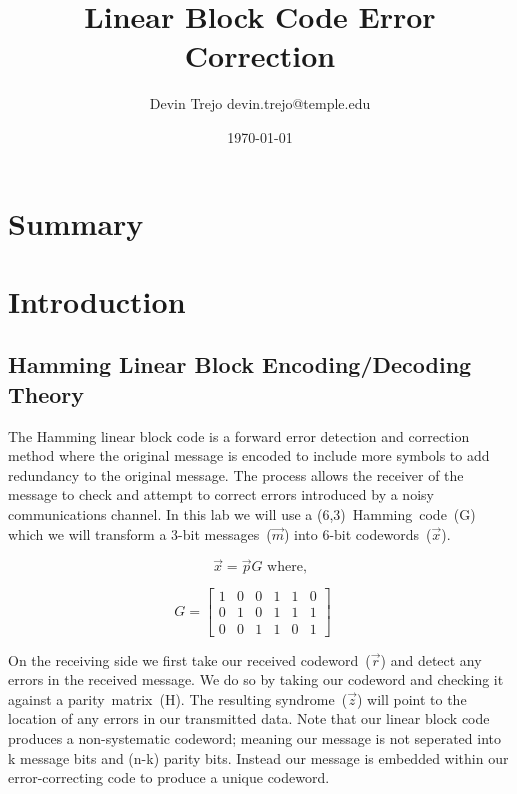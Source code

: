 \documentclass[12pt]{article}
\begin{document}
\title{Linear Block Code Error Correction}
\author{Devin Trejo \tabularnewline devin.trejo@temple.edu }
\date{\today}
\maketitle

\section{Summary}
\label{sect:summary}


\section{Introduction}
\label{sect:intro}
\subsection{Hamming Linear Block Encoding/Decoding Theory}
The Hamming linear block code is a forward error detection and correction 
method where the original message is encoded to include more symbols to 
add redundancy to the original message. The process allows the receiver of
the message to check and attempt to correct errors introduced by a 
noisy communications channel. In this lab we will use a (6,3)~Hamming~code~(G)
which we will transform a 3-bit messages~($\vec{m}$) into 6-bit 
codewords~($\vec{x}$).

\begin{equation}
    \vec{x}=\vec{p}G \text{ where,}
    \label{eq:encoder}
\end{equation}

$$
    G=
    \begin{bmatrix}
        1 & 0 & 0 & 1 & 1 & 0 \\
        0 & 1 & 0 & 1 & 1 & 1 \\
        0 & 0 & 1 & 1 & 0 & 1
    \end{bmatrix} \quad
$$

On the receiving side we first take our received codeword~($\vec{r}$) and 
detect any errors in the received message. We do so by taking our 
codeword and checking it against a parity~matrix~(H). The resulting 
syndrome~($\vec{z}$) will point to the location of any errors in our 
transmitted data. Note that our linear block code produces a 
non-systematic codeword; meaning our message is not seperated into k message
bits and (n-k) parity bits. \cite{Balakrishnan2010} Instead our message is 
embedded within our error-correcting code to produce a unique codeword. 
\end{document}

